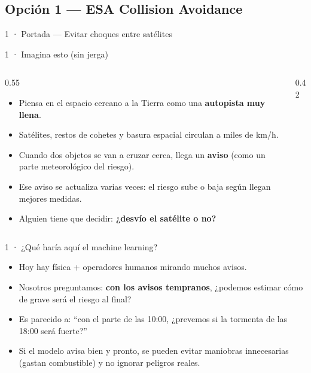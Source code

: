 \subsection{Opción 1 --- ESA Collision Avoidance}

\begin{frame}{1 · Portada --- Evitar choques entre satélites}
\end{frame}

\begin{frame}{1 · Imagina esto (sin jerga)}
  \begin{columns}[T]
    \begin{column}{0.55\textwidth}
      \begin{itemize}
        \item Piensa en el espacio cercano a la Tierra como una \textbf{autopista muy llena}.
        \item Satélites, restos de cohetes y basura espacial circulan a miles de km/h.
        \item Cuando dos objetos se van a cruzar cerca, llega un \textbf{aviso} (como un parte meteorológico del riesgo).
        \item Ese aviso se actualiza varias veces: el riesgo sube o baja según llegan mejores medidas.
        \item Alguien tiene que decidir: \textbf{¿desvío el satélite o no?}
      \end{itemize}
    \end{column}
    \begin{column}{0.42\textwidth}
    \end{column}
  \end{columns}
\end{frame}

\begin{frame}{1 · ¿Qué haría aquí el machine learning?}
  \begin{itemize}
    \item Hoy hay física + operadores humanos mirando muchos avisos.
    \item Nosotros preguntamos: \textbf{con los avisos tempranos}, ¿podemos estimar cómo de grave será el riesgo al final?
    \item Es parecido a: ``con el parte de las 10:00, ¿prevemos si la tormenta de las 18:00 será fuerte?''
    \item Si el modelo avisa bien y pronto, se pueden evitar maniobras innecesarias (gastan combustible) y no ignorar peligros reales.
  \end{itemize}
\end{frame}

